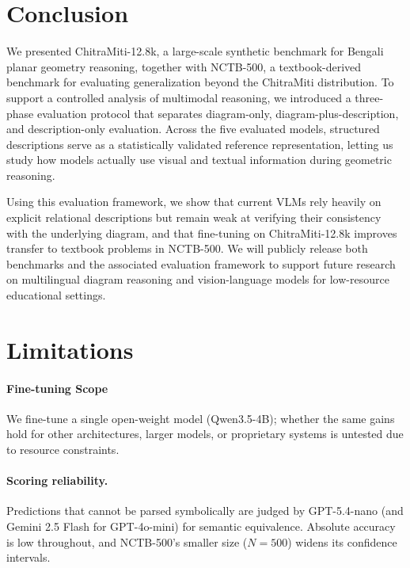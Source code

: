 \documentclass[11pt]{article}
\begin{document}
\section{Conclusion}
\label{sec:conclusion}

We presented ChitraMiti-12.8k, a large-scale synthetic benchmark for Bengali planar geometry reasoning, together with NCTB-500, a textbook-derived benchmark for evaluating generalization beyond the ChitraMiti distribution. To support a controlled analysis of multimodal reasoning, we introduced a three-phase evaluation protocol that separates diagram-only, diagram-plus-description, and description-only evaluation. Across the five evaluated models, structured descriptions serve as a statistically validated reference representation, letting us study how models actually use visual and textual information during geometric reasoning.

Using this evaluation framework, we show that current VLMs rely heavily on explicit relational descriptions but remain weak at verifying their consistency with the underlying diagram, and that fine-tuning on ChitraMiti-12.8k improves transfer to textbook problems in NCTB-500. We will publicly release both benchmarks and the associated evaluation framework to support future research on multilingual diagram reasoning and vision-language models for low-resource educational settings.

\section*{Limitations}
\label{sec:limitations}

\paragraph{Fine-tuning Scope} We fine-tune a single open-weight model (Qwen3.5-4B); whether the same gains hold for other architectures, larger models, or proprietary systems is untested due to resource constraints. 

\paragraph{Scoring reliability.} 
Predictions that cannot be parsed symbolically are judged by GPT-5.4-nano (and Gemini 2.5 Flash for GPT-4o-mini) for semantic equivalence. Absolute accuracy is low throughout, and NCTB-500's smaller size ($N=500$) widens its confidence intervals.
\end{document}
